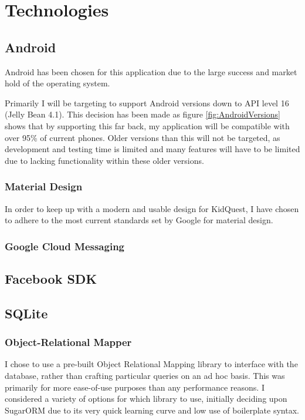\chapter{Technologies}

\section{Android}
Android has been chosen for this application due to the large success and market hold of the operating system.

Primarily I will be targeting to support Android versions down to API level 16 (Jelly Bean 4.1).
This decision has been made as figure \ref{fig:AndroidVersions} shows that by supporting this far back, my application will be compatible with over 95\% of current phones. 
Older versions than this will not be targeted, as development and testing time is limited and many features will have to be limited due to lacking functionality within these older versions.

\subsection{Material Design}
In order to keep up with a modern and usable design for KidQuest, I have chosen to adhere to the most current standards set by Google for material design.

\subsection{Google Cloud Messaging}

\section{Facebook SDK}

\section{SQLite}

\subsection{Object-Relational Mapper}
I chose to use a pre-built Object Relational Mapping library to interface with the database, rather than crafting particular queries on an ad hoc basis.
This was primarily for more ease-of-use purposes than any performance reasons. 
I considered a variety of options for which library to use, initially deciding upon SugarORM due to its very quick learning curve and low use of boilerplate syntax. 

